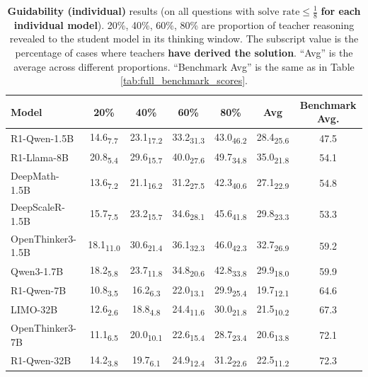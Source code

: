 \documentclass{article} %
\begin{document}
\begin{table}[ht!]
  \centering
  \begin{tabular}{lccccc|c}
    \toprule
    \textbf{Model} & \textbf{20\%} & \textbf{40\%} & \textbf{60\%} & \textbf{80\%} & \textbf{Avg} & \textbf{Benchmark Avg.} \\
    \midrule
    R1-Qwen-1.5B    & 14.6\textsubscript{7.7} & 23.1\textsubscript{17.2} & 33.2\textsubscript{31.3} & 43.0\textsubscript{46.2} & 28.4\textsubscript{25.6} & 47.5 \\
    R1-Llama-8B     & 20.8\textsubscript{5.4} & 29.6\textsubscript{15.7} & 40.0\textsubscript{27.6} & 49.7\textsubscript{34.8} & 35.0\textsubscript{21.8} & 54.1 \\
    DeepMath-1.5B           & 13.6\textsubscript{7.2} & 21.1\textsubscript{16.2} & 31.2\textsubscript{27.5} & 42.3\textsubscript{40.6} & 27.1\textsubscript{22.9} & 54.8 \\
    DeepScaleR-1.5B         & 15.7\textsubscript{7.5} & 23.2\textsubscript{15.7} & 34.6\textsubscript{28.1} & 45.6\textsubscript{41.8} & 29.8\textsubscript{23.3} & 53.3 \\
    OpenThinker3-1.5B       & 18.1\textsubscript{11.0} & 30.6\textsubscript{21.4} & 36.1\textsubscript{32.3} & 46.0\textsubscript{42.3} & 32.7\textsubscript{26.9} & 59.2 \\
    Qwen3-1.7B              & 18.2\textsubscript{5.8} & 23.7\textsubscript{11.8} & 34.8\textsubscript{20.6} & 42.8\textsubscript{33.8} & 29.9\textsubscript{18.0} & 59.9 \\
    \midrule
    R1-Qwen-7B      & 10.8\textsubscript{3.5} & 16.2\textsubscript{6.3} & 22.0\textsubscript{13.1} & 29.9\textsubscript{25.4} & 19.7\textsubscript{12.1} & 64.6 \\
    LIMO-32B                & 12.6\textsubscript{2.6} & 18.8\textsubscript{4.8} & 24.4\textsubscript{11.6} & 30.0\textsubscript{21.8} & 21.5\textsubscript{10.2} & 67.3 \\
    OpenThinker3-7B         & 11.1\textsubscript{6.5} & 20.0\textsubscript{10.1} & 22.6\textsubscript{15.4} & 28.7\textsubscript{23.4} & 20.6\textsubscript{13.8} & 72.1 \\
    R1-Qwen-32B     & 14.2\textsubscript{3.8} & 19.7\textsubscript{6.1} & 24.9\textsubscript{12.4} & 31.2\textsubscript{22.6} & 22.5\textsubscript{11.2} & 72.3 \\
    \bottomrule
  \end{tabular}
  \caption{\textbf{Guidability (individual)} results (on all questions with $\text{solve rate} \leq \frac{1}{8}$ \textbf{for each individual model}). 20\%, 40\%, 60\%, 80\% are proportion of teacher reasoning revealed to the student model in its thinking window. The subscript value is the percentage of cases where teachers \textbf{have derived the solution}. ``Avg'' is the average across different proportions. ``Benchmark Avg'' is the same as in Table \ref{tab:full_benchmark_scores}.}
  \label{tab:guidability_all}
\end{table}
\end{document}
